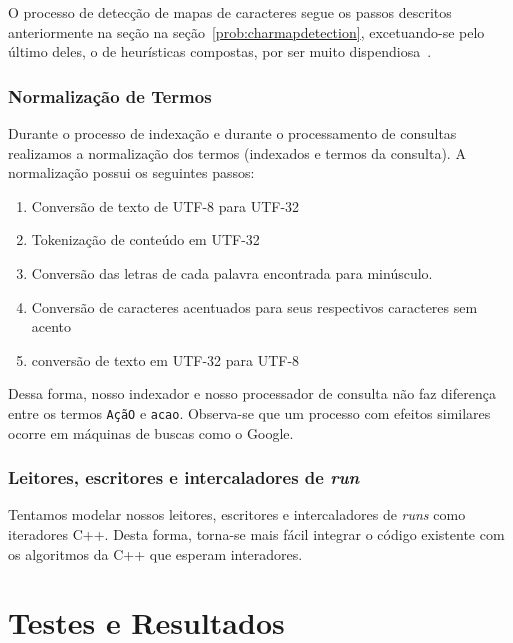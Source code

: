 \documentclass[10pt,twocolumn]{article}
\begin{document}
O processo de detecção de mapas de caracteres segue os passos descritos
anteriormente na seção na seção~\ref{prob:charmapdetection},
excetuando-se pelo último deles, o de heurísticas compostas, por ser
muito dispendiosa~\cite{mozillaiuc}.


\subsubsection{Normalização de Termos}

Durante o processo de indexação e durante o processamento de consultas
realizamos a normalização dos termos (indexados e termos da consulta).
A normalização possui os seguintes passos:
\begin{enumerate}
\item Conversão de texto de UTF-8 para UTF-32
\item Tokenização de conteúdo em UTF-32
\item Conversão das letras de cada palavra encontrada para minúsculo.
\item Conversão de caracteres acentuados para seus respectivos
caracteres sem acento
\item conversão de texto em UTF-32 para UTF-8
\end{enumerate}

Dessa forma, nosso indexador e nosso processador de consulta  não faz
diferença entre os termos \texttt{AçãO} e \texttt{acao}. Observa-se que
um processo com efeitos similares ocorre em máquinas de buscas como o
Google. 

\subsubsection{Leitores, escritores e intercaladores de \emph{run}}

Tentamos modelar nossos leitores, escritores e intercaladores de
\emph{runs} como iteradores C++. Desta forma, torna-se mais fácil
integrar o código existente com os algoritmos da C++ que esperam
interadores.


%
%


\section{Testes e Resultados}
\end{document}
